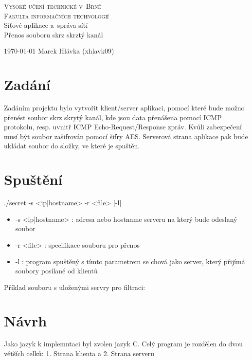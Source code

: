 \documentclass[a4paper, 11pt]{article}
\begin{document}
\begin{titlepage}
	\begin{center}
		\Huge
		\textsc{Vysoké učení technické v~Brně} \\
		\huge
		\textsc{Fakulta informačních technologií} \\
		\LARGE
		Síťové aplikace a~správa sítí\\
		\Huge
		Přenos souboru skrz skrztý kanál
	\end{center}
	{\Large
		\today
		\hfill
		Marek Hlávka (xhlavk09)
	}
\end{titlepage}
\tableofcontents
\newpage

\section{Zadání}
Zadáním projektu bylo vytvořit klient/server aplikaci, pomocí které bude možno přenést soubor skrz skrytý kanál, kde jsou data přenášena pomocí ICMP protokolu, resp. uvnitř ICMP Echo-Request/Response zpráv. Kvůli zabezpečení musí být soubor zašifrován pomocí šifry AES. Serverová strana aplikace pak bude ukládat soubor do složky, ve které je spuštěn.

\section{Spuštění}

\centerline{\large./secret -s <ip|hostname> -r <file> [-l]}
\begin{itemize}
\item -s <ip|hostname> : adresa nebo hostname serveru na který bude odeslaný soubor
\item -r <file> : specifikace souboru pro přenos
\item -l : program spuštěný s tímto parametrem se chová jako server, který přijímá soubory posílané od klientů
\end{itemize}
Příklad souboru s uloženými servry pro filtraci:\\
\begin{figure}[h]
\end{figure}

\newpage
\section{Návrh}
Jako jazyk k implemntaci byl zvolen jazyk C. Celý program je rozdělen do dvou větších celků: 1. Strana klienta a 2. Strana serveru
\end{document}
